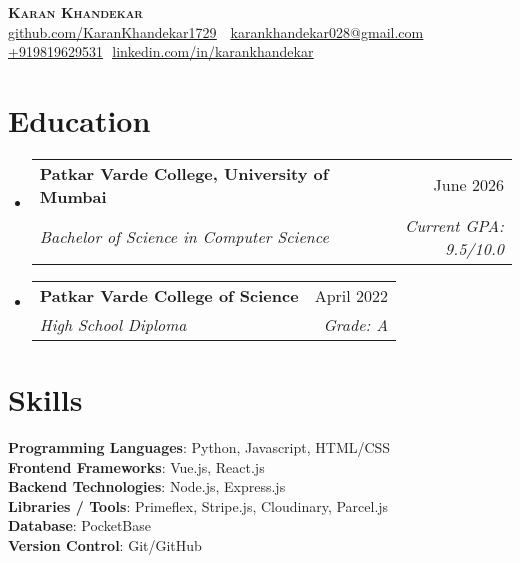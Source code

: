 \documentclass[letterpaper,11pt]{article}
\makeatletter
\newcommand{\resumeSubheading}[4]{
  \vspace{-2pt}\item
    \begin{tabular*}{0.97\textwidth}[t]{l@{\extracolsep{\fill}}r}
      \textbf{#1} & #2 \\
      \textit{\small#3} & \textit{\small #4} \\
    \end{tabular*}\vspace{-7pt}
}
\newcommand{\resumeSubHeadingListStart}{\begin{itemize}[leftmargin=0.15in, label={}]}
\newcommand{\resumeSubHeadingListEnd}{\end{itemize}}
\makeatother
\begin{document}
\begin{flushright}
  \vspace{-4pt}
\end{flushright}

\vspace{-7pt}

\begin{center}
    \textbf{\Huge \scshape Karan Khandekar} \\ \vspace{8pt}
    \small 
    \faGithub
    \href{github.com/KaranKhandekar1729}{\underline{github.com/KaranKhandekar1729}} $  $
    \faEnvelope$  $
    \href{mailto:karankhandekar028@gmail.com}
    {\underline{karankhandekar028@gmail.com}}
    \faPhone$  $
    \underline{+919819629531}
    \faLinkedin$  $
    \href{linkedin.com/in/karankhandekar}{\underline{linkedin.com/in/karankhandekar}} $  $
\end{center}

\section{Education}
  \resumeSubHeadingListStart
    \resumeSubheading
        {Patkar Varde College, University of Mumbai}{June 2026}
        {Bachelor of Science in Computer Science}{Current GPA: 9.5/10.0}
  
    \resumeSubheading
      {Patkar Varde College of Science}{April 2022}
      {High School Diploma}{Grade: A}
      

  \resumeSubHeadingListEnd

\section{Skills}
\begin{itemize}[leftmargin=0.15in, label={}]
\small{\item{
    \textbf{Programming Languages}{: Python, Javascript, HTML/CSS} \\
    
    \textbf{Frontend Frameworks}{: Vue.js, React.js} \\
    
    \textbf{Backend Technologies}{: Node.js, Express.js} \\
    
    \textbf{Libraries / Tools}{: Primeflex, Stripe.js, Cloudinary, Parcel.js} \\
    
    \textbf{Database}{: PocketBase} \\
    
    \textbf{Version Control}{: Git/GitHub} \\
}}
\end{itemize}
\end{document}
